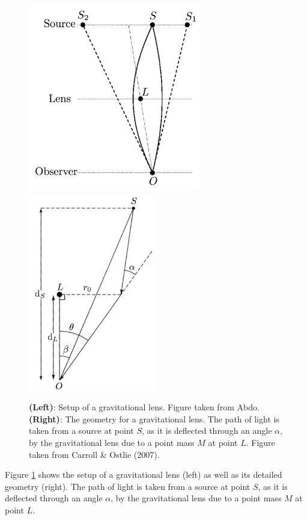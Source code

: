 \documentclass[a4paper,10pt]{article}
\begin{document}
\begin{figure}[t]
    \centering
    \includegraphics[width=7.5cm]{figures/GravitationalLens.png}
    \includegraphics[width=5.5cm]{figures/GravitationalLensAngles.png}
    \caption{\footnotesize{\textbf{(Left)}: Setup of a gravitational lens. Figure taken from Abdo. \textbf{(Right)}: The geometry for a gravitational lens. The path of light is taken from a source at point $S$, as it is deflected through an angle $\alpha$, by the gravitational lens due to a point mass $M$ at point $L$. Figure taken from Carroll \& Ostlie (2007).}}
    \label{fig:gravitationallens}
\end{figure}

{\noindent}Figure \ref{fig:gravitationallens} shows the setup of a gravitational lens (left) as well as its detailed geometry (right). The path of light is taken from a source at point $S$, as it is deflected through an angle $\alpha$, by the gravitational lens due to a point mass $M$ at point $L$.
\end{document}
